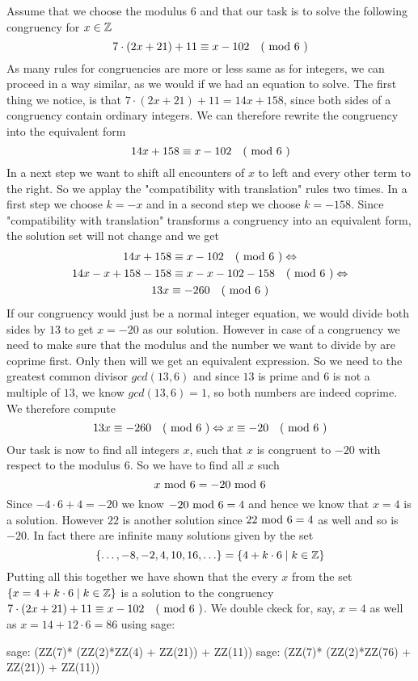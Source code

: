 \begin{example}
\label{example_first_congruency}
Assume that we choose the modulus $6$ and that our task is to solve the following congruency for $x\in \mathbb{Z}$
$$7\cdot(2x+21) + 11 \equiv x-102 \quad \text{( mod } 6 \text{ )}$$
As many rules for congruencies are more or less same as for integers, we can proceed in a way similar, as we would if we had an equation to solve. 
The first thing we notice, is that $7\cdot(2x+21) + 11= 14x +158$, since both sides of a congruency contain ordinary integers. We can therefore rewrite the congruency into the equivalent form
$$14x +158 \equiv x-102 \quad \text{( mod } 6 \text{ )}$$
In a next step we want to shift all encounters of $x$ to left and every other term to the right. So we applay the "compatibility with translation" rules two times. In a first step we choose $k=-x$ and in a second step we choose $k=-158$. Since "compatibility with translation" transforms a congruency into an equivalent form, the solution set will not change and we get 
\begin{multline*}
14x +158 \equiv x-102 \quad \text{( mod } 6 \text{ )} \Leftrightarrow\\
14x-x +158-158 \equiv x-x-102-158 \quad \text{( mod } 6 \text{ )} \Leftrightarrow \\
13x \equiv -260 \quad \text{( mod } 6 \text{ )}
\end{multline*}
If our congruency would just be a normal integer equation, we would divide both sides by $13$ to get $x=-20$ as our solution. However in case of a congruency we need to make sure that the modulus and the number we want to divide by are coprime first. Only then will we get an equivalent expression. So we need to the greatest common divisor $gcd(13,6)$ and since $13$ is prime and $6$ is not a multiple of $13$, we know $gcd(13,6)=1$, so both numbers are indeed coprime. We therefore compute 
$$
13x \equiv -260 \quad \text{( mod } 6 \text{ )} \Leftrightarrow x \equiv -20 \quad \text{( mod } 6 \text{ )}
$$
Our task is now to find all integers $x$, such that $x$ is congruent to $-20$ with respect to the modulus $6$. So we have to find all $x$ such
$$
x \text{ mod } 6 = -20 \text{ mod } 6
$$
Since $-4\cdot 6 +4 = -20$ we know $ -20 \text{ mod } 6 = 4$ and hence we know that $x=4$ is a solution. However $22$ is another solution since $ 22 \text{ mod } 6 = 4$ as well and so is $-20$. In fact there are infinite many solutions given by the set
$$
\{\ldots, -8,-2, 4,10, 16,\ldots\} = \{4+k\cdot 6 \;|\; k\in \mathbb{Z}\}
$$
Putting all this together we have shown that the every $x$ from the set $\{x=4+k\cdot 6 \;|\; k\in \mathbb{Z}\}$ is a solution to the congruency $7\cdot(2x+21) + 11 \equiv x-102 \quad \text{( mod } 6 \text{ )}$. We double ckeck for, say, $x=4$ as well as $x=14 + 12\cdot 6 = 86$ using sage:
\begin{sagecommandline}
sage: (ZZ(7)* (ZZ(2)*ZZ(4) + ZZ(21)) + ZZ(11))  %
sage: (ZZ(7)* (ZZ(2)*ZZ(76) + ZZ(21)) + ZZ(11))  %
\end{sagecommandline}
\end{example}

